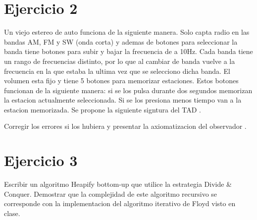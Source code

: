 \documentclass[10pt,a4paper]{article}
\begin{document}
\section{Ejercicio 2}

Un viejo estereo de auto funciona de la siguiente manera. Solo capta radio en las bandas AM, FM y SW (onda corta) y ademas de botones para seleccionar la banda tiene botones para subir y bajar la frecuencia de a 10Hz. Cada banda tiene un rango de frecuencias distinto, por lo que al cambiar de banda vuelve a la frecuencia en la que estaba la ultima vez que se selecciono dicha banda. El volumen esta fijo y tiene 5 botones para memorizar estaciones. Estos botones funcionan de la siguiente manera: si se los pulsa durante dos segundos memorizan la estacion actualmente seleccionada. Si se los presiona menos tiempo van a la estacion memorizada. Se propone la siguiente signtura del TAD .
\newline
\newline
\begin{tad}{}
	\medskip	
	\tadObservadores
	\medskip
	\medskip
	\medskip
	
	\tadGeneradores
	\medskip
	\medskip
	\medskip
	\medskip
	\medskip
	\medskip
	\medskip
	
	\tadAxiomas[$\forall$]
	
	\medskip
	\medskip
	\medskip
	\medskip

\end{tad}

Corregir los errores si los hubiera y presentar la axiomatizacion del observador .
\newpage

\section{Ejercicio 3}

Escribir un algoritmo Heapify bottom-up que utilice la estrategia Divide \& Conquer. Demostrar que la complejidad de este algoritmo recursivo se corresponde con la implementacion del algoritmo iterativo de Floyd visto en clase.
\newline
\newline
\end{document}
